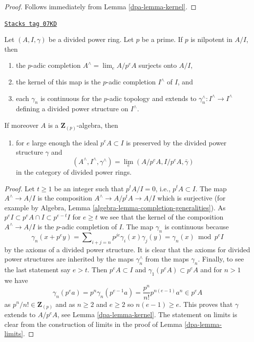 \begin{proof}

Follows immediately from Lemma \ref{dpa-lemma-kernel}.
\end{proof}

\begin{lemma}
\label{dpa-lemma-extend-to-completion}
\href{https://stacks.math.columbia.edu/tag/07KD}{\texttt{Stacks tag 07KD}}

Let $(A, I, \gamma)$ be a divided power ring. Let $p$ be a prime.
If $p$ is nilpotent in $A/I$, then
\begin{enumerate}
\item the $p$-adic completion $A^\wedge = \lim_e A/p^eA$ surjects onto $A/I$,
\item the kernel of this map is the $p$-adic completion $I^\wedge$ of $I$, and
\item each $\gamma_n$ is continuous for the $p$-adic topology and extends
to $\gamma_n^\wedge : I^\wedge \to I^\wedge$ defining a divided power
structure on $I^\wedge$.
\end{enumerate}
If moreover $A$ is a $\mathbf{Z}_{(p)}$-algebra, then
\begin{enumerate}
\item[(4)] for $e$ large enough the ideal $p^eA \subset I$ is preserved by the
divided power structure $\gamma$ and
$$
(A^\wedge, I^\wedge, \gamma^\wedge) = \lim_e (A/p^eA, I/p^eA, \bar\gamma)
$$
in the category of divided power rings.
\end{enumerate}
\end{lemma}

\begin{proof}

Let $t \geq 1$ be an integer such that $p^tA/I = 0$, i.e., $p^tA \subset I$.
The map $A^\wedge \to A/I$ is the composition $A^\wedge \to A/p^tA \to A/I$
which is surjective (for example by
Algebra, Lemma \ref{algebra-lemma-completion-generalities}).
As $p^eI \subset p^eA \cap I \subset p^{e - t}I$ for $e \geq t$ we see
that the kernel of the composition $A^\wedge \to A/I$ is the $p$-adic
completion of $I$. The map $\gamma_n$ is continuous because
$$
\gamma_n(x + p^ey) =
\sum\nolimits_{i + j = n} p^{je}\gamma_i(x)\gamma_j(y) =
\gamma_n(x) \bmod p^eI
$$
by the axioms of a divided power structure. It is clear that the axioms
for divided power structures are inherited by the maps $\gamma_n^\wedge$
from the maps $\gamma_n$. Finally, to see the last statement say $e > t$.
Then $p^eA \subset I$ and $\gamma_1(p^eA) \subset p^eA$ and for $n > 1$
we have
$$
\gamma_n(p^ea) = p^n \gamma_n(p^{e - 1}a) = \frac{p^n}{n!} p^{n(e - 1)}a^n
\in p^e A
$$
as $p^n/n! \in \mathbf{Z}_{(p)}$ and as $n \geq 2$ and $e \geq 2$ so
$n(e - 1) \geq e$.
This proves that $\gamma$ extends to $A/p^eA$, see Lemma \ref{dpa-lemma-kernel}.
The statement on limits is clear from the construction of limits in
the proof of Lemma \ref{dpa-lemma-limits}.
\end{proof}

